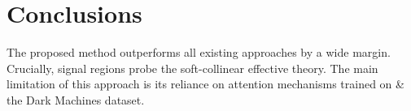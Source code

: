 \section{Conclusions}\label{sec:conclusions}

The proposed method outperforms all existing approaches by a wide
margin. Crucially, signal regions probe the soft-collinear effective
theory. The main limitation of this approach is its reliance on
attention mechanisms trained on & the Dark Machines dataset.

